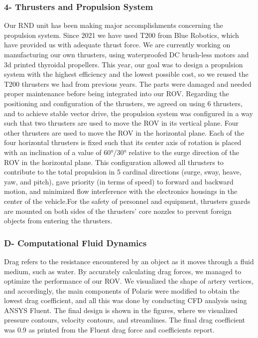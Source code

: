 \documentclass[a4paper,12pt,leqno]{report}
\begin{document}
\textcolor{orange!60}{
\subsubsection{4- Thrusters and Propulsion System }}
Our RND unit has been making major accomplishments concerning the  propulsion system. Since 2021 we have used T200 from Blue Robotics,  which have provided us with adequate thrust force. We are currently  working on manufacturing our own thrusters, using waterproofed DC  brush-less motors and 3d printed thyroidal propellers. 
This year, our goal was to design a propulsion system with the highest  
efficiency and the lowest possible cost, so we reused the T200 thrusters we had from previous years. The parts were damaged and needed proper maintenance before being integrated into our ROV.
Regarding the positioning and configuration of the thrusters, we agreed on using 6 thrusters, and to achieve stable vector drive, the propulsion system was configured in a way such that two thrusters are used to move the ROV in its vertical plane. Four other thrusters are used to move the ROV in the horizontal plane. 
Each of the four horizontal thrusters is fixed such that its center axis  of rotation is placed with an inclination of a value of 60°/30° relative  to the surge direction of the ROV in the horizontal plane. This  configuration allowed all thrusters to contribute to the total propulsion in 5 cardinal directions (surge, sway, heave, yaw, and pitch), gave  priority (in terms of speed) to forward and backward motion, and  minimized flow interference with the electronics housings in the  center of the vehicle.For the safety of personnel and equipment, thrusters guards are mounted on both sides of the  thrusters’ core nozzles to prevent foreign objects from entering the thrusters. \\
\textcolor{blue!40}{
\subsubsection{D- Computational Fluid Dynamics}}
Drag refers to the resistance encountered by an object as it moves  through a fluid medium, such as water. By accurately calculating drag  forces, we managed to optimize the performance of our ROV. 
We visualized the shape of artery vertices, and accordingly, the main  components of Polaris were modified to obtain the lowest drag  coefficient, and all this was done by conducting CFD analysis using  ANSYS Fluent. The final design is shown in the figures, where we visualized pressure contours, velocity contours, and streamlines. The  final drag coefficient was 0.9 as printed from the Fluent drag force and  coefficients report.\\
\end{document}
